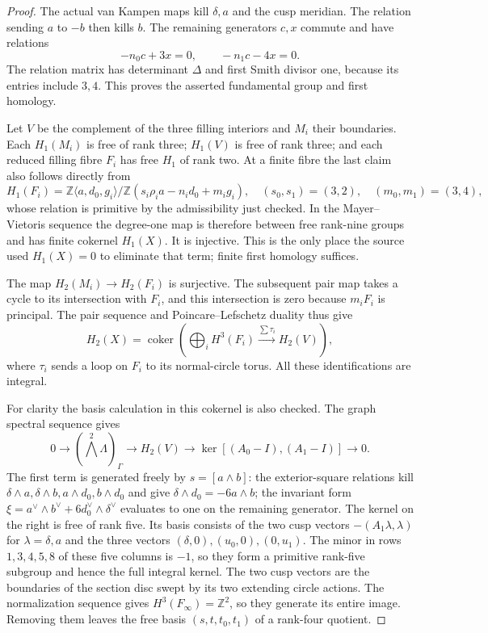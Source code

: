 \begin{proof}
The actual van Kampen maps kill $\delta,a$ and the cusp meridian.
The relation sending $a$ to $-b$ then kills $b$. The remaining
generators $c,x$ commute and have relations
\[
 -n_0c+3x=0,\qquad -n_1c-4x=0.
\]
The relation matrix has determinant $\Delta$ and first Smith
divisor one, because its entries include $3,4$. This proves the
asserted fundamental group and first homology.

Let $V$ be the complement of the three filling interiors and
$M_i$ their boundaries. Each $H_1(M_i)$ is free of rank three;
$H_1(V)$ is free of rank three; and each reduced filling fibre
$F_i$ has free $H_1$ of rank two. At a finite fibre the last
claim also follows directly from
\[
 H_1(F_i)=\mathbb Z\langle a,d_0,g_i\rangle/
  \mathbb Z(s_i\rho_i a-n_i d_0+m_i g_i),
 \quad(s_0,s_1)=(3,2),\quad(m_0,m_1)=(3,4),
\]
whose relation is primitive by the admissibility just checked.
In the Mayer--Vietoris sequence the degree-one map is therefore
between free rank-nine groups and has finite cokernel
$H_1(X)$. It is injective. This is the only place the source
used $H_1(X)=0$ to eliminate that term; finite first homology
suffices.

The map $H_2(M_i)\to H_2(F_i)$ is surjective. The subsequent
pair map takes a cycle to its intersection with $F_i$, and this
intersection is zero because $m_iF_i$ is principal. The pair
sequence and Poincare--Lefschetz duality thus give
\[
 H_2(X)=\operatorname{coker}\left(
  \bigoplus_i H^3(F_i)\xrightarrow{\sum\tau_i}H_2(V)
 \right),
\]
where $\tau_i$ sends a loop on $F_i$ to its normal-circle torus.
All these identifications are integral.

For clarity the basis calculation in this cokernel is also
checked. The graph spectral sequence gives
\[
0\longrightarrow(\textstyle\bigwedge^2\Lambda)_\Gamma
 \longrightarrow H_2(V)
 \longrightarrow\ker[(A_0-I),(A_1-I)]\longrightarrow0.
\]
The first term is generated freely by $s=[a\wedge b]$:
the exterior-square relations kill
$\delta\wedge a,\delta\wedge b,a\wedge d_0,b\wedge d_0$
and give $\delta\wedge d_0=-6a\wedge b$; the invariant
form $\xi=a^\vee\wedge b^\vee+6d_0^\vee\wedge\delta^\vee$
evaluates to one on the remaining generator. The kernel on the
right is free of rank five. Its basis consists of the two cusp
vectors $-(A_1\lambda,\lambda)$ for $\lambda=\delta,a$ and
the three vectors $(\delta,0),(u_0,0),(0,u_1)$.
The minor in rows $1,3,4,5,8$ of these five columns is $-1$,
so they form a primitive rank-five subgroup and hence the full
integral kernel.
The two cusp vectors are the boundaries of the section disc
swept by its two extending circle actions. The normalization
sequence gives $H^3(F_\infty)=\mathbb Z^2$, so they generate
its entire image. Removing them leaves the free basis
$(s,t,t_0,t_1)$ of a rank-four quotient.


\end{proof}
